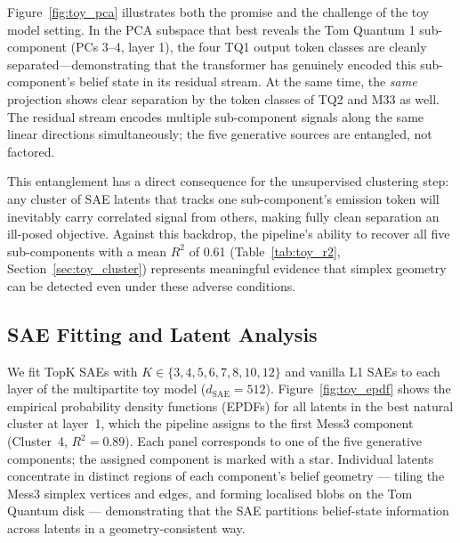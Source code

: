 \documentclass{article}
\begin{document}
Figure~\ref{fig:toy_pca} illustrates both the promise and the challenge of the toy
model setting.  In the PCA subspace that best reveals the Tom Quantum 1
sub-component (PCs 3--4, layer 1), the four TQ1 output token classes are cleanly
separated---demonstrating that the transformer has genuinely encoded this
sub-component's belief state in its residual stream.  At the same time, the
\emph{same} projection shows clear separation by the token classes of TQ2 and M33
as well.  The residual stream encodes multiple sub-component signals along the same
linear directions simultaneously; the five generative sources are entangled, not
factored.

This entanglement has a direct consequence for the unsupervised clustering step: any
cluster of SAE latents that tracks one sub-component's emission token will
inevitably carry correlated signal from others, making fully clean separation an
ill-posed objective.  Against this backdrop, the pipeline's ability to recover all
five sub-components with a mean $R^2$ of 0.61 (Table~\ref{tab:toy_r2},
Section~\ref{sec:toy_cluster}) represents meaningful evidence that simplex geometry
can be detected even under these adverse conditions.

\subsection{SAE Fitting and Latent Analysis}
\label{sec:toy_sae}

We fit TopK SAEs with $K \in \{3, 4, 5, 6, 7, 8, 10, 12\}$ and vanilla L1 SAEs to
each layer of the multipartite toy model ($d_{\mathrm{SAE}} = 512$).
Figure~\ref{fig:toy_epdf} shows the empirical probability density functions (EPDFs)
for all latents in the best natural cluster at layer~1, which the pipeline assigns
to the first Mess3 component (Cluster~4, $R^2 = 0.89$).  Each panel corresponds to
one of the five generative components; the assigned component is marked with a star.
Individual latents concentrate in distinct regions of each component's belief
geometry — tiling the Mess3 simplex vertices and edges, and forming localised blobs
on the Tom Quantum disk — demonstrating that the SAE partitions belief-state
information across latents in a geometry-consistent way.
\end{document}
